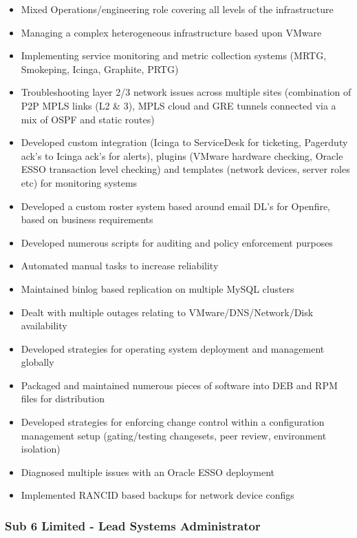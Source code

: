 \begin{itemize}
\item
  Mixed Operations/engineering role covering all levels of the
  infrastructure
\item
  Managing a complex heterogeneous infrastructure based upon VMware
\item
  Implementing service monitoring and metric collection systems (MRTG,
  Smokeping, Icinga, Graphite, PRTG)
\item
  Troubleshooting layer 2/3 network issues across multiple sites
  (combination of P2P MPLS links (L2 \& 3), MPLS cloud and GRE tunnels
  connected via a mix of OSPF and static routes)
\item
  Developed custom integration (Icinga to ServiceDesk for ticketing,
  Pagerduty ack's to Icinga ack's for alerts), plugins (VMware hardware
  checking, Oracle ESSO transaction level checking) and templates
  (network devices, server roles etc) for monitoring systems
\item
  Developed a custom roster system based around email DL's for Openfire,
  based on business requirements
\item
  Developed numerous scripts for auditing and policy enforcement
  purposes
\item
  Automated manual tasks to increase reliability
\item
  Maintained binlog based replication on multiple MySQL clusters
\item
  Dealt with multiple outages relating to VMware/DNS/Network/Disk
  availability
\item
  Developed strategies for operating system deployment and management
  globally
\item
  Packaged and maintained numerous pieces of software into DEB and RPM
  files for distribution
\item
  Developed strategies for enforcing change control within a
  configuration management setup (gating/testing changesets, peer
  review, environment isolation)
\item
  Diagnosed multiple issues with an Oracle ESSO deployment
\item
  Implemented RANCID based backups for network device configs
\end{itemize}
\subsubsection{Sub 6 Limited - Lead Systems Administrator}

